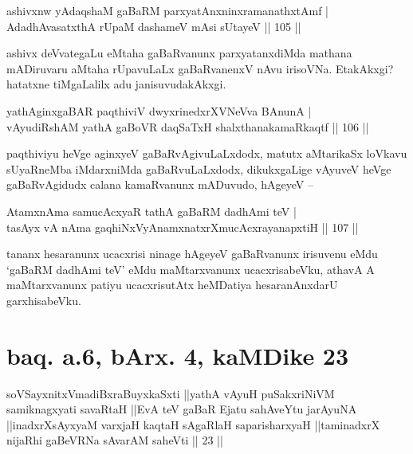 \begin{shl}
ashivxnw yAdaqshaM gaBaRM parxyatAnxninxramanathxtAmf | \\
AdadhAvasatxthA rUpaM dashameV mAsi sUtayeV \hfill|| 105 || 
\end{shl}

\begin{artha}
ashivx deVvategaLu eMtaha gaBaRvanunx parxyatanxdiMda mathana 
mADiruvaru aMtaha rUpavuLaLx gaBaRvanenxV nAvu irisoVNa. EtakAkxgi? 
hatatxne tiMgaLalilx adu janisuvudakAkxgi.
\end{artha}


\begin{shl}
yathA\s ginxgaBAR paqthiviV dwyxrinedxrXVNeVva BAnunA | \\
vAyudiRshAM yathA gaBoVR daqSaTxH shalxthanakamaRkaqtf \hfill|| 106 || 
\end{shl}

\begin{artha}
paqthiviyu heVge aginxyeV gaBaRvAgivuLaLxdodx, matutx aMtarikaSx 
loVkavu sUyaRneMba iMdarxniMda gaBaRvuLaLxdodx, dikukxgaLige vAyuveV
heVge gaBaRvAgidudx calana kamaRvanunx mADuvudo, hAgeyeV --
\end{artha}


\begin{shl}
AtamxnAma samucAcxyaR tathA gaBaRM dadhAmi teV | \\
tasAyx vA nAma gaqhiNxVyAnamxnatxrXmucAcxrayanapxtiH \hfill|| 107 ||  
\end{shl}

\begin{artha}
tananx hesaranunx ucacxrisi ninage hAgeyeV gaBaRvanunx irisuvenu eMdu 
`gaBaRM dadhAmi teV' eMdu maMtarxvanunx ucacxrisabeVku, athavA A 
maMtarxvanunx patiyu ucacxrisutAtx heMDatiya hesaranAnxdarU 
garxhisabeVku.
\end{artha}

\section*{baq. a.6, bArx. 4, kaMDike 23}

\begin{shl}
soVSayxnitxVmadiBxraBuyxkaSxti ||yathA vAyuH puSakxriNiVM samiknagxyati savaRtaH ||EvA teV gaBaR Ejatu sahAveYtu jarAyuNA ||inadxrXsAyxyaM varxjaH kaqtaH sAgaRlaH saparisharxyaH ||taminadxrX nijaRhi gaBeVRNa sAvarAM saheVti || 23 ||
\end{shl}


